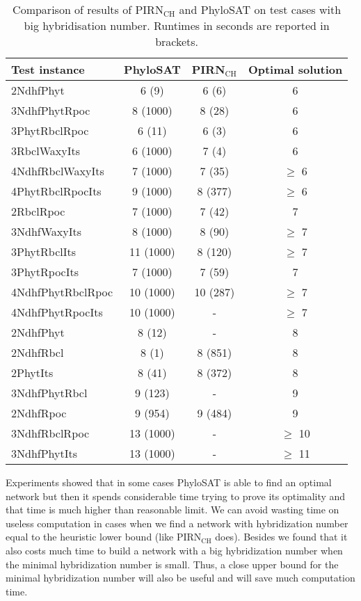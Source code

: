 \documentclass[runningheads, envcountsame, a4paper]{llncs}
\begin{document}
\begin{table}[t]
\centering
\caption{Comparison of results of PIRN$\mathrm{_{CH}}$ and PhyloSAT on test cases with big hybridisation number. Runtimes in seconds are reported in brackets.}
\begin{tabular}{l | c | c | c}
  Test instance & PhyloSAT & PIRN$\mathrm{_{CH}}$ & Optimal solution \\
  \hline
  2NdhfPhyt & 6 (9) & 6 (6) & 6 \\
  3NdhfPhytRpoc & 8 (1000) & 8 (28) & 6 \\
  3PhytRbclRpoc & 6 (11) & 6 (3) & 6 \\
  3RbclWaxyIts & 6 (1000) & 7 (4) & 6 \\
  4NdhfRbclWaxyIts & 7 (1000) & 7 (35) & $\geq$ 6 \\
  4PhytRbclRpocIts & 9 (1000) & 8 (377) & $\geq$ 6 \\
  2RbclRpoc & 7 (1000) & 7 (42) & 7 \\
  3NdhfWaxyIts & 8 (1000) & 8 (90) & $\geq$ 7 \\
  3PhytRbclIts & 11 (1000) & 8 (120) & $\geq$ 7 \\
  3PhytRpocIts & 7 (1000) & 7 (59) & 7 \\
  4NdhfPhytRbclRpoc & 10 (1000) & 10 (287) & $\geq$ 7 \\
  4NdhfPhytRpocIts & 10 (1000) & - & $\geq$ 7 \\
  2NdhfPhyt & 8 (12) & - & 8 \\
  2NdhfRbcl & 8 (1) & 8 (851) & 8 \\
  2PhytIts & 8 (41) & 8 (372) & 8 \\
  3NdhfPhytRbcl & 9 (123) & - & 9 \\
  2NdhfRpoc & 9 (954) & 9 (484) & 9 \\
  3NdhfRbclRpoc & 13 (1000) & - & $\geq$ 10 \\
  3NdhfPhytIts & 13 (1000) & - & $\geq$ 11 \\
  
\end{tabular}
\label{detailed-results}
\end{table}

Experiments showed that in some cases PhyloSAT is able to find an optimal network but then it spends considerable time trying to prove its optimality 
and that time is much higher than reasonable limit. We can avoid wasting time on useless computation 
in cases when we find a network with hybridization number equal to the heuristic lower bound (like PIRN$\mathrm{_{CH}}$ does). Besides we found 
that it also costs much time to build a network with a big hybridization number when the minimal hybridization number is small. 
Thus, a close upper bound for the minimal hybridization number will also be useful and will save much computation time.
\end{document}
